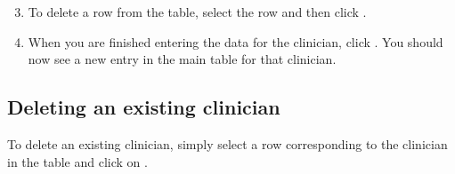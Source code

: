 \documentclass[letterpaper,10pt,english]{sphinxmanual}
\begin{document}
\begin{figure}[h!]
\centering
{}\end{figure}

\begin{DUlineblock}{0em}
\item[] 
\end{DUlineblock}
\begin{enumerate}
\setcounter{enumi}{2}
\item {} 
To delete a row from the table, select the row and then click .

\end{enumerate}

\begin{figure}[h!]
\centering
{}\end{figure}

\begin{DUlineblock}{0em}
\item[] 
\end{DUlineblock}
\begin{enumerate}
\setcounter{enumi}{3}
\item {} 
When you are finished entering the data for the clinician, click .
You should now see a new entry in the main table for that clinician.

\end{enumerate}

\begin{figure}[h!]
\centering
{}\end{figure}

\begin{DUlineblock}{0em}
\item[] 
\end{DUlineblock}


\subsection{Deleting an existing clinician}
\label{\detokenize{index:deleting-an-existing-clinician}}
To delete an existing clinician, simply select a row corresponding
to the clinician in the table and click on .
\end{document}
